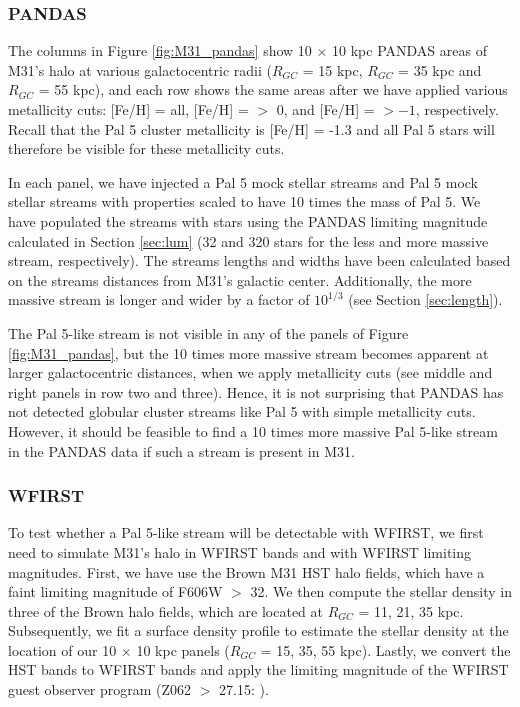 \documentclass[twocolumn]{aastex62}
\begin{document}
\subsubsection{PANDAS}
\label{sec:PANDAS}
The columns in Figure \ref{fig:M31_pandas} show 10 $\times$ 10 kpc PANDAS areas of M31's halo at various galactocentric radii ($R_{GC}$ = 15  kpc, $R_{GC}$ = 35 kpc and $R_{GC}$ = 55 kpc), and each row shows the same areas after we have applied various metallicity cuts: [Fe/H] = all,  [Fe/H] = $>$ 0, and  [Fe/H] = $> -1 $, respectively. Recall that the Pal 5 cluster metallicity is  [Fe/H] = -1.3 and all Pal 5 stars will therefore be visible for these metallicity cuts. 

In each panel, we have injected a Pal 5 mock stellar streams and Pal 5 mock stellar streams with properties scaled to have 10 times the mass of Pal 5. We have populated the streams with stars using the PANDAS limiting magnitude calculated in Section \ref{sec:lum} (32 and 320 stars for the less and more massive stream, respectively).  The streams lengths and widths have been calculated based on the streams distances from M31's galactic center. Additionally, the more massive stream is longer and wider by a factor of $10^{1/3}$ (see Section \ref{sec:length}). 

The Pal 5-like stream is not visible in any of the panels of Figure \ref{fig:M31_pandas}, but the 10 times more massive stream becomes apparent at larger galactocentric distances, when we apply metallicity cuts (see middle and right panels in row two and three). Hence, it is not surprising that PANDAS has not detected globular cluster streams like Pal 5 with simple metallicity cuts. However, it should be feasible to find a 10 times more massive Pal 5-like stream in the PANDAS data if such a stream is present in M31. 

\subsubsection{WFIRST}
\label{sec:WFIRST}
To test whether a Pal 5-like stream will be detectable with WFIRST, we first need to simulate M31's halo in WFIRST bands and with WFIRST limiting magnitudes. First, we have use the Brown M31 HST halo fields, which have a faint limiting magnitude of F606W $>$ 32. We then compute the stellar density in three of the Brown halo fields, which are located at $R_{GC}$ = 11, 21, 35 kpc. Subsequently, we fit a surface density profile to estimate the stellar density at the location of our 10 $\times$ 10 kpc panels ($R_{GC}$ = 15, 35, 55 kpc). Lastly, we convert the HST bands to WFIRST bands and apply the limiting magnitude of the WFIRST guest observer program (Z062 $>$ 27.15: \citealt{spergel13}). 
\end{document}
